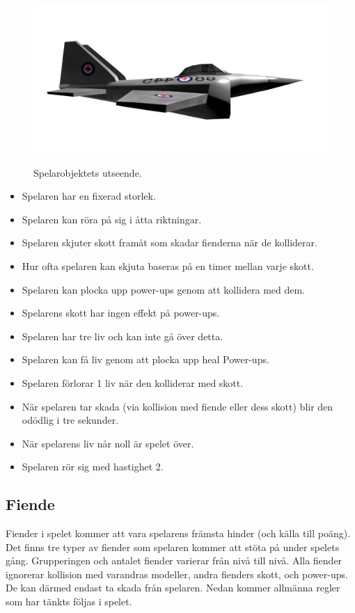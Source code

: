\documentclass{TDP005mall}
\begin{document}
\begin{figure}[h!]
  \centering
  \includegraphics[scale=0.2]{Images/Player.png}
  \label{}
  \caption{Spelarobjektets utseende.}
\end{figure}
\begin{itemize}
\item Spelaren har en fixerad storlek.
\item Spelaren kan röra på sig i åtta riktningar.
\item Spelaren skjuter skott framåt som skadar fienderna när de kolliderar.
\item Hur ofta spelaren kan skjuta baseras på en timer mellan varje skott. 
\item Spelaren kan plocka upp power-ups genom att kollidera med dem.
\item Spelarens skott har ingen effekt på power-ups.
\item Spelaren har tre liv och kan inte gå över detta.
\item Spelaren kan få liv genom att plocka upp heal Power-ups.
\item Spelaren förlorar 1 liv när den kolliderar med skott.
\item När spelaren tar skada (via kollision med fiende eller dess skott) blir den odödlig i tre sekunder.
\item När spelarens liv når noll är spelet över.
\item Spelaren rör sig med hastighet 2.


\end{itemize}

\subsection{Fiende}
Fiender i spelet kommer att vara spelarens främsta hinder (och källa till poäng). 
Det finns tre typer av fiender som spelaren kommer att stöta på under spelets gång. 
Grupperingen och antalet fiender varierar från nivå till nivå. 
Alla fiender ignorerar kollision med varandras modeller, andra fienders skott, och power-ups. De kan därmed endast ta skada från spelaren. 
Nedan kommer allmänna regler som har tänkts följas i spelet.
\end{document}
